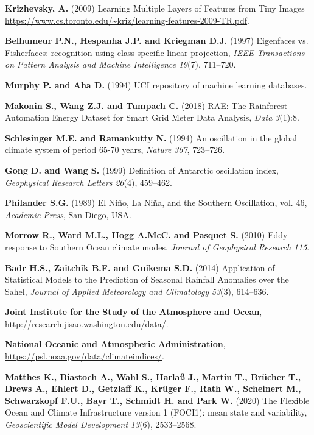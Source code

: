 \documentclass{CUP-JNL-DTM}%
\theoremstyle{definition}
\numberwithin{equation}{section}
\begin{document}
\begin{Backmatter}
\begin{thebibliography}{}
\textbf{Krizhevsky, A.} (2009) Learning Multiple Layers of Features from Tiny Images \url{https://www.cs.toronto.edu/~kriz/learning-features-2009-TR.pdf}.

\textbf{Belhumeur P.N., Hespanha J.P. and Kriegman D.J.} (1997) Eigenfaces vs. Fisherfaces: recognition using class specific linear projection, \textit{IEEE Transactions on Pattern Analysis and Machine Intelligence} \textit{19}(7), {711}--{720}.

\textbf{Murphy P. and Aha D.} (1994) UCI repository of machine learning databases.

\textbf{Makonin S., Wang Z.J. and Tumpach C.} (2018) RAE: The Rainforest Automation Energy Dataset for Smart Grid Meter Data Analysis, \textit{Data} \textit{3}(1):8. 

\textbf{Schlesinger M.E. and Ramankutty N.} (1994) An oscillation in the global climate system of period 65-70 years, \textit{Nature} \textit{367}, {723}--{726}.

\textbf{Gong D. and Wang S.} (1999) Definition of Antarctic oscillation index, \textit{Geophysical Research Letters} \textit{26}(4), {459}--{462}.

\textbf{Philander S.G.} (1989) El Ni\~{n}o, La Ni\~{n}a, and the Southern Oscillation, vol. 46, \textit{Academic Press}, San Diego, USA.

\textbf{Morrow R., Ward M.L., Hogg A.McC. and Pasquet S.} (2010) Eddy response to Southern Ocean climate modes, \textit{Journal of Geophysical Research} \textit{115}.

\textbf{Badr H.S., Zaitchik B.F. and Guikema S.D.} (2014) Application of Statistical Models to the Prediction of Seasonal Rainfall Anomalies over the Sahel, \textit{Journal of Applied Meteorology and Climatology} \textit{53}(3), {614}--{636}.

\textbf{Joint Institute for the Study of the Atmosphere and Ocean}, \url{http://research.jisao.washington.edu/data/}.

\textbf{National Oceanic and Atmospheric Administration}, \url{https://psl.noaa.gov/data/climateindices/}.

\textbf{Matthes K., Biastoch A., Wahl S., Harlaß J., Martin T., Brücher T., Drews A., Ehlert D., Getzlaff K., Krüger F., Rath W., Scheinert M., Schwarzkopf F.U.,  Bayr T., Schmidt H. and Park W.} (2020) The Flexible Ocean and Climate Infrastructure version 1 (FOCI1): mean state and variability, \textit{Geoscientific Model Development} \textit{13}(6), {2533}--{2568}.


\end{thebibliography}
\end{Backmatter}
\end{document}
